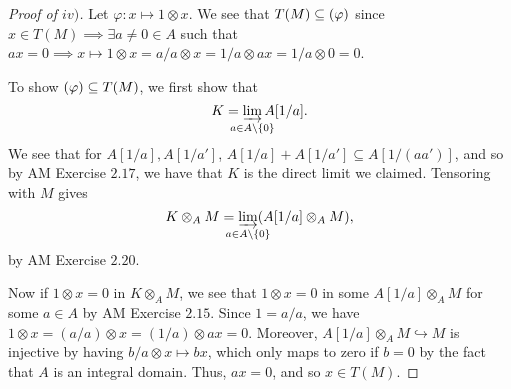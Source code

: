 \documentclass[12pt,letterpaper]{article}
\theoremstyle{definition}
\theoremstyle{remark}
\numberwithin{figure}{problem}
\numberwithin{equation}{section}
\let\ker\relax
\DeclareMathOperator{\ker}{Ker}
\begin{document}
\begin{proof}[Proof of $iv)$]
  Let $\varphi: x \mapsto 1 \otimes x$. We see that $T(M) \subseteq \ker(\varphi)$ since $x \in T(M) \implies \exists a \ne 0 \in A$ such that $ax = 0 \implies x \mapsto 1 \otimes x = a/a \otimes x = 1/a \otimes ax = 1/a \otimes 0 = 0$.
  \par To show $\ker(\varphi) \subseteq T(M)$, we first show that
  \begin{equation*}
    K = \varinjlim_{\mathclap{a \in A \setminus \{0\}}} A[1/a].
  \end{equation*}
  We see that for $A[1/a], A[1/a']$, $A[1/a] + A[1/a'] \subseteq A[1/(aa')]$, and so by AM Exercise $2.17$, we have that $K$ is the direct limit we claimed. Tensoring with $M$ gives
  \begin{equation*}
    K \otimes_A M = \varinjlim_{\mathclap{a \in A \setminus \{0\}}} (A[1/a] \otimes_A M),
  \end{equation*}
  by AM Exercise $2.20$. 
  \par Now if $1 \otimes x = 0$ in $K \otimes_A M$, we see that $1 \otimes x = 0$ in some $A[1/a] \otimes_A M$ for some $a \in A$ by AM Exercise $2.15$. Since $1 = a/a$, we have $1 \otimes x = (a/a) \otimes x = (1/a) \otimes ax = 0$. Moreover, $A[1/a] \otimes_A M \hookrightarrow M$ is injective by having $b/a \otimes x \mapsto bx$, which only maps to zero if $b = 0$ by the fact that $A$ is an integral domain. Thus, $ax = 0$, and so $x \in T(M)$.
\end{proof}
\end{document}
